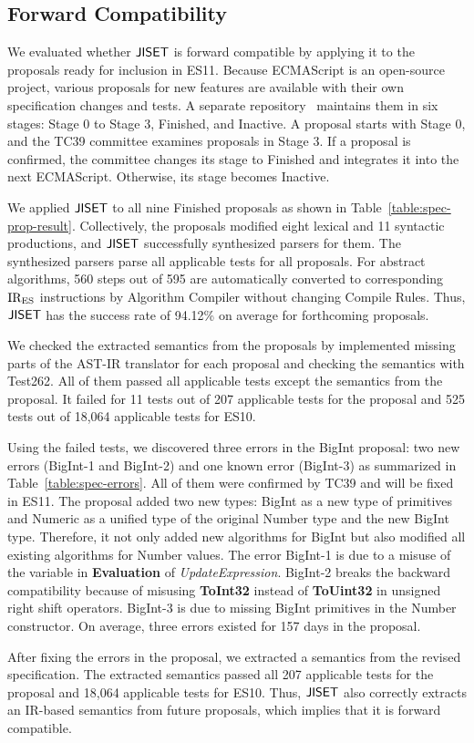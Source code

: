 \subsection{Forward Compatibility}
We evaluated whether \( \text{\sf JISET} \) is forward compatible by applying it
to the proposals ready for inclusion in ES11.  Because
ECMAScript is an open-source project, various proposals for new
features are available with their own specification changes and tests.
A separate repository~\cite{proposals} maintains them in six
stages: Stage 0 to Stage 3, Finished, and Inactive.  A proposal
starts with Stage 0, and the TC39 committee examines proposals in Stage 3.
If a proposal is confirmed, the committee changes
its stage to Finished and integrates it into the next ECMAScript.
Otherwise, its stage becomes Inactive.

We applied \( \text{\sf JISET} \) to all nine Finished proposals as shown in
Table~\ref{table:spec-prop-result}.
Collectively, the proposals modified eight lexical and
11 syntactic productions, and \( \text{\sf JISET} \) successfully
synthesized parsers for them.  The synthesized parsers parse all
applicable tests for all proposals.  For abstract algorithms,
560 steps out of 595 are automatically converted to
corresponding \( \text{IR}_\text{ES} \) instructions by \textsf{Algorithm Compiler}
without changing {\sf Compile Rules}.  Thus, \( \text{\sf JISET} \) has the
success rate of 94.12\% on average for forthcoming proposals.

We checked the extracted semantics from the proposals
by implemented missing parts of the AST-IR translator for
each proposal and checking the semantics with Test262.  All of them
passed all applicable tests except the semantics from the
 proposal.  It failed for 11 tests out of 207
applicable tests for the proposal and 525 tests out of
18,064 applicable tests for ES10.

Using the failed tests, we discovered three errors in the
BigInt proposal: two new errors (BigInt-1 and BigInt-2) and one known
error (BigInt-3) as summarized in Table~\ref{table:spec-errors}.
All of them were confirmed by TC39 and will be fixed in ES11.
The proposal added two new types: BigInt as a new type of primitives
and Numeric as a unified type of the original Number type and the new BigInt type.
Therefore, it not only added new algorithms for BigInt but also modified
all existing algorithms for Number values.
The error BigInt-1 is due to a misuse of the variable
 in {\bf Evaluation} of {\it UpdateExpression}.
BigInt-2 breaks the backward compatibility because of
misusing {\bf ToInt32} instead of {\bf ToUint32}
in unsigned right shift operators.
BigInt-3 is due to missing BigInt primitives in the Number constructor.
On average, three errors existed for 157 days in the proposal.

After fixing the errors in the proposal, we extracted a semantics from
the revised specification.  The extracted semantics passed all 207
applicable tests for the proposal and 18,064 applicable tests
for ES10.  Thus, \( \text{\sf JISET} \) also correctly extracts an IR-based
semantics from future proposals, which implies that it is forward compatible.
